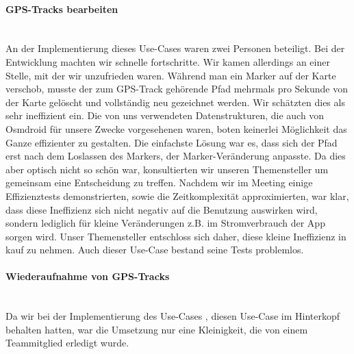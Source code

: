 \documentclass[10pt]{article}
\begin{document}
\paragraph{GPS-Tracks bearbeiten} \quad\\
An der Implementierung dieses Use-Cases waren zwei Personen beteiligt. 
Bei der Entwicklung machten wir schnelle fortschritte. 
Wir kamen allerdings an einer Stelle, mit der wir unzufrieden waren. Während man ein Marker auf der Karte verschob, musste
der zum GPS-Track gehörende Pfad mehrmals pro Sekunde von der Karte gelöscht und vollständig neu gezeichnet werden. 
Wir schätzten dies als sehr ineffizient ein. Die von uns verwendeten Datenstrukturen, die auch von 
Osmdroid für unsere Zwecke vorgesehenen waren, boten keinerlei Möglichkeit das Ganze effizienter zu gestalten.
Die einfachste Lösung war es, dass sich der Pfad erst nach dem Loslassen des Markers, der Marker-Veränderung anpasste.
Da dies aber optisch nicht so schön war, konsultierten wir unseren Themensteller um gemeinsam eine Entscheidung zu treffen.
Nachdem wir im Meeting einige Effizienztests demonstrierten, sowie die Zeitkomplexität approximierten, war klar, dass 
diese Ineffizienz sich nicht negativ auf die Benutzung auswirken wird, sondern lediglich für kleine Veränderungen 
z.B. im Stromverbrauch der App sorgen wird. Unser Themensteller entschloss sich daher, diese kleine Ineffizienz in kauf zu 
nehmen. Auch dieser Use-Case bestand seine Tests problemlos.

\paragraph{Wiederaufnahme von GPS-Tracks} \quad\\
Da wir bei der Implementierung des Use-Cases , diesen Use-Case im Hinterkopf behalten hatten,
war die Umsetzung nur eine Kleinigkeit, die von einem Teammitglied erledigt wurde.
\end{document}
